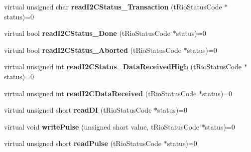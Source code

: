\begin{DoxyCompactItemize}
\item 
\hypertarget{classnFPGA_1_1nFRC__2012__1__6__4_1_1tDIO_a7230d81d573b1d1a014be48cd2dbf165}{
virtual unsigned char {\bfseries readI2CStatus\_\-Transaction} (tRioStatusCode $\ast$status)=0}
\label{classnFPGA_1_1nFRC__2012__1__6__4_1_1tDIO_a7230d81d573b1d1a014be48cd2dbf165}

\item 
\hypertarget{classnFPGA_1_1nFRC__2012__1__6__4_1_1tDIO_ac90493542db0e84d8cf6c08679cb84c1}{
virtual bool {\bfseries readI2CStatus\_\-Done} (tRioStatusCode $\ast$status)=0}
\label{classnFPGA_1_1nFRC__2012__1__6__4_1_1tDIO_ac90493542db0e84d8cf6c08679cb84c1}

\item 
\hypertarget{classnFPGA_1_1nFRC__2012__1__6__4_1_1tDIO_adba691782e59a183d58a51aced65639e}{
virtual bool {\bfseries readI2CStatus\_\-Aborted} (tRioStatusCode $\ast$status)=0}
\label{classnFPGA_1_1nFRC__2012__1__6__4_1_1tDIO_adba691782e59a183d58a51aced65639e}

\item 
\hypertarget{classnFPGA_1_1nFRC__2012__1__6__4_1_1tDIO_a2d3e169d0de56e4f64edbceea78c4e07}{
virtual unsigned int {\bfseries readI2CStatus\_\-DataReceivedHigh} (tRioStatusCode $\ast$status)=0}
\label{classnFPGA_1_1nFRC__2012__1__6__4_1_1tDIO_a2d3e169d0de56e4f64edbceea78c4e07}

\item 
\hypertarget{classnFPGA_1_1nFRC__2012__1__6__4_1_1tDIO_a5789f61da08fd395d38b1b28337822a5}{
virtual unsigned int {\bfseries readI2CDataReceived} (tRioStatusCode $\ast$status)=0}
\label{classnFPGA_1_1nFRC__2012__1__6__4_1_1tDIO_a5789f61da08fd395d38b1b28337822a5}

\item 
\hypertarget{classnFPGA_1_1nFRC__2012__1__6__4_1_1tDIO_af1691dcee8de40c1b3ba2721fa9a8b84}{
virtual unsigned short {\bfseries readDI} (tRioStatusCode $\ast$status)=0}
\label{classnFPGA_1_1nFRC__2012__1__6__4_1_1tDIO_af1691dcee8de40c1b3ba2721fa9a8b84}

\item 
\hypertarget{classnFPGA_1_1nFRC__2012__1__6__4_1_1tDIO_ad35f6fd1c34d73cdf23fb5c3fdda1d03}{
virtual void {\bfseries writePulse} (unsigned short value, tRioStatusCode $\ast$status)=0}
\label{classnFPGA_1_1nFRC__2012__1__6__4_1_1tDIO_ad35f6fd1c34d73cdf23fb5c3fdda1d03}

\item 
\hypertarget{classnFPGA_1_1nFRC__2012__1__6__4_1_1tDIO_a368f401626ef7402d3da3bcd8117de23}{
virtual unsigned short {\bfseries readPulse} (tRioStatusCode $\ast$status)=0}
\label{classnFPGA_1_1nFRC__2012__1__6__4_1_1tDIO_a368f401626ef7402d3da3bcd8117de23}


\end{DoxyCompactItemize}
